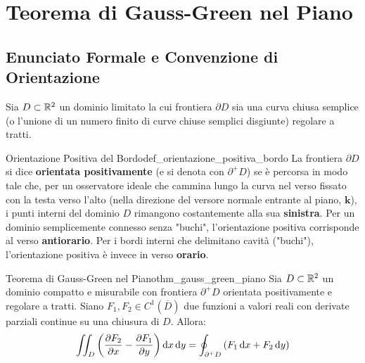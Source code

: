 \section{Teorema di Gauss-Green nel Piano}

\subsection{Enunciato Formale e Convenzione di Orientazione}

Sia $D \subset \mathbb{R}^2$ un dominio limitato la cui frontiera $\partial D$ sia una curva chiusa semplice (o l'unione di un numero finito di curve chiuse semplici disgiunte) regolare a tratti.

\begin{definizione}{Orientazione Positiva del Bordo}{def_orientazione_positiva_bordo}
La frontiera $\partial D$ si dice \textbf{orientata positivamente} (e si denota con $\partial^+ D$) se è percorsa in modo tale che, per un osservatore ideale che cammina lungo la curva nel verso fissato con la testa verso l'alto (nella direzione del versore normale entrante al piano, $\mathbf{k}$), i punti interni del dominio $D$ rimangono costantemente alla sua \textbf{sinistra}.
Per un dominio semplicemente connesso senza "buchi", l'orientazione positiva corrisponde al verso \textbf{antiorario}. Per i bordi interni che delimitano cavità ("buchi"), l'orientazione positiva è invece in verso \textbf{orario}.
\end{definizione}

\begin{teorema}{Teorema di Gauss-Green nel Piano}{thm_gauss_green_piano}
Sia $D \subset \mathbb{R}^2$ un dominio compatto e misurabile con frontiera $\partial^+ D$ orientata positivamente e regolare a tratti. Siano $F_1, F_2 \in C^1(\overline{D})$ due funzioni a valori reali con derivate parziali continue su una chiusura di $D$. Allora:
\[
\iint_D \left( \frac{\partial F_2}{\partial x} - \frac{\partial F_1}{\partial y} \right) \mathop{}\!\mathrm{d} x\mathop{}\!\mathrm{d} y = \oint_{\partial^+ D} \left( F_1 \mathop{}\!\mathrm{d} x + F_2 \mathop{}\!\mathrm{d} y \right)
\]
\end{teorema}


